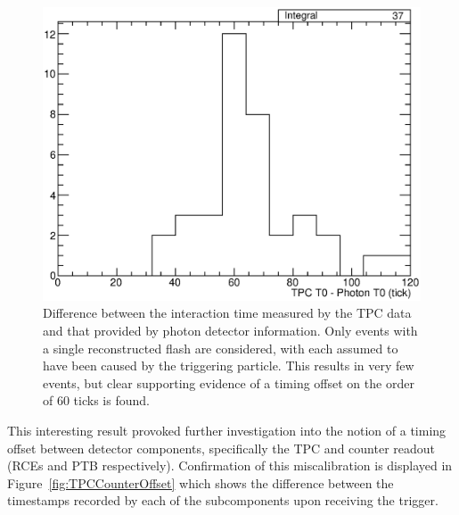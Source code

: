 \begin{figure}
  \centering
  \includegraphics[width=12cm]{T0OffsetTPCPhoton.eps}
  \caption[Difference between the interaction time measured by the TPC data and that provided by photon detector information.]{Difference between the interaction time measured by the TPC data and that provided by photon detector information.  Only events with a single reconstructed flash are considered, with each assumed to have been caused by the triggering particle.  This results in very few events, but clear supporting evidence of a timing offset on the order of 60 ticks is found.}
  \label{fig:TPCPhotonT0Difference}
\end{figure}

This interesting result provoked further investigation into the notion of a timing offset between detector components, specifically the TPC and counter readout (RCEs and PTB respectively).  Confirmation of this miscalibration is displayed in Figure~\ref{fig:TPCCounterOffset} which shows the difference between the timestamps recorded by each of the subcomponents upon receiving the trigger.

